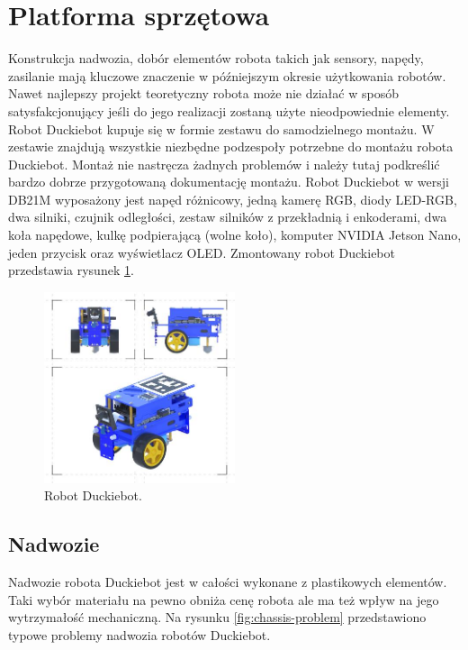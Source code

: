 \documentclass{svproc}
\begin{document}
\section{Platforma sprzętowa}\label{sec:hardware}
Konstrukcja nadwozia, dobór elementów robota takich jak sensory, napędy, zasilanie mają kluczowe znaczenie w późniejszym okresie użytkowania robotów. Nawet najlepszy projekt teoretyczny robota może nie działać w sposób satysfakcjonujący jeśli do jego realizacji zostaną użyte nieodpowiednie elementy. 
Robot Duckiebot kupuje się w formie zestawu do samodzielnego montażu. W zestawie znajdują wszystkie niezbędne podzespoły potrzebne do montażu robota Duckiebot. Montaż  nie nastręcza żadnych problemów i  należy tutaj podkreślić bardzo dobrze przygotowaną dokumentację montażu. Robot Duckiebot w wersji DB21M wyposażony jest napęd różnicowy, jedną kamerę RGB, diody LED-RGB, dwa silniki, czujnik odległości, zestaw silników z przekładnią i enkoderami, dwa koła napędowe, kulkę podpierającą (wolne koło), komputer NVIDIA Jetson Nano, jeden przycisk oraz wyświetlacz OLED. Zmontowany robot Duckiebot przedstawia rysunek \ref{fig:robot-duckiebot}.

\begin{figure}
    \centering
    \includegraphics[width=0.5\textwidth]{d3.jpg}
    \caption{Robot Duckiebot.}
    \label{fig:robot-duckiebot}
\end{figure}

\subsection{Nadwozie}
Nadwozie robota Duckiebot jest w całości wykonane z plastikowych elementów. Taki wybór materiału na pewno obniża cenę robota ale ma też wpływ na jego wytrzymałość mechaniczną. Na rysunku \ref{fig:chassis-problem} przedstawiono typowe problemy nadwozia robotów Duckiebot.
\end{document}
